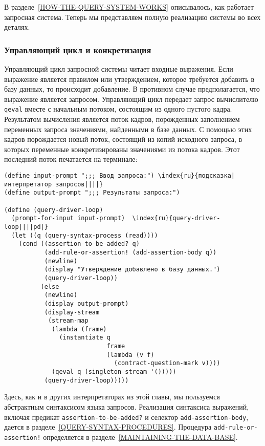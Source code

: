 В разделе~\ref{HOW-THE-QUERY-SYSTEM-WORKS}
описывалось, как работает запросная система.  Теперь мы представляем
полную реализацию системы во всех деталях.

\subsubsection{Управляющий цикл и конкретизация}
\label{THE-DRIVER-LOOP-AND-INSTANTIATION}%

Управляющий цикл запросной системы читает входные
выражения.  Если выражение является правилом или утверждением, которое
требуется добавить в базу данных, то происходит добавление.  В
противном случае предполагается, что выражение является запросом.
Управляющий цикл передает запрос вычислителю {\tt qeval} вместе
с начальным потоком, состоящим из одного пустого кадра.
Результатом вычисления является поток кадров, порожденных заполнением
переменных запроса значениями, найденными в базе данных.  С помощью
этих кадров порождается новый поток, состоящий из копий исходного
запроса, в которых переменные конкретизированы значениями из потока
кадров.  Этот последний поток печатается на терминале:

\begin{Verbatim}[fontsize=\small]
(define input-prompt ";;; Ввод запроса:") \index{ru}{подсказка|интерпретатор запросов||||}
(define output-prompt ";;; Результаты запроса:")

(define (query-driver-loop)
  (prompt-for-input input-prompt)  \index{ru}{query-driver-loop||||pd|}
  (let ((q (query-syntax-process (read))))
    (cond ((assertion-to-be-added? q)
           (add-rule-or-assertion! (add-assertion-body q))
           (newline)
           (display "Утверждение добавлено в базу данных.")
           (query-driver-loop))
          (else
           (newline)
           (display output-prompt)
           (display-stream
            (stream-map
             (lambda (frame)
               (instantiate q
                            frame
                            (lambda (v f)
                              (contract-question-mark v))))
             (qeval q (singleton-stream '()))))
           (query-driver-loop)))))
\end{Verbatim}
Здесь, как и в других интерпретаторах из этой главы, мы пользуемся
абстрактным синтаксисом языка запросов. Реализация синтаксиса
выражений, включая предикат {\tt assertion-to-be-added?} и
селектор {\tt add-assertion-body}, дается в 
разделе~\ref{QUERY-SYNTAX-PROCEDURES}. Процедура
{\tt add-rule-or-assertion!} определяется в 
разделе~\ref{MAINTAINING-THE-DATA-BASE}.
\sloppy

